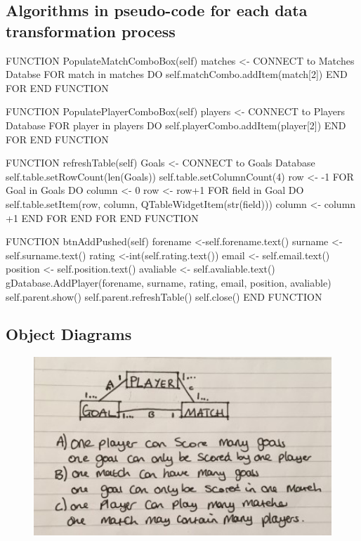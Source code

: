 \subsection{Algorithms in pseudo-code for each data transformation process}
FUNCTION PopulateMatchComboBox(self)
	matches <- CONNECT to  Matches Databse
	FOR match in matches DO
		self.matchCombo.addItem(match[2])
	END FOR
	END FUNCTION

FUNCTION PopulatePlayerComboBox(self)
	players <- CONNECT to Players Database
	FOR player in players DO
		self.playerCombo.addItem(player[2])
	END FOR
END FUNCTION

FUNCTION refreshTable(self)
	Goals <- CONNECT to Goals Database
	self.table.setRowCount(len(Goals))
	self.table.setColumnCount(4)
	row <- -1
	FOR Goal in Goals DO
		column <- 0
		row <- row+1
		FOR field in Goal DO
			self.table.setItem(row, column, QTableWidgetItem(str(field)))
			column <- column +1
		END FOR
	END FOR
END FUNCTION
 
FUNCTION btnAddPushed(self)
	forename <-self.forename.text()
	surname <-self.surname.text()
	rating <-int(self.rating.text())
	email <- self.email.text()
	position <- self.position.text()
	avaliable <- self.avaliable.text()
	gDatabase.AddPlayer(forename, surname, rating, email, position, avaliable)
	self.parent.show()
	self.parent.refreshTable()
	self.close()
END FUNCTION

\subsection{Object Diagrams}
\begin{figure}[H]
	\includegraphics[width=150mm]{objectDiagram}
\end{figure}

